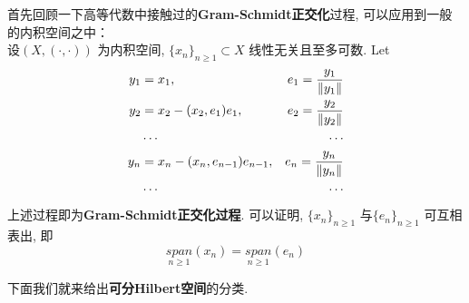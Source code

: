 	首先回顾一下高等代数中接触过的\textbf{Gram-Schmidt正交化}过程, 可以应用到一般的内积空间之中：\\
	设$(X , (\cdot , \cdot))$ 为内积空间, $\{ x_n \}_{n \geq 1} \subset X$ 线性无关且至多可数. Let
	\begin{align}
		y_1 &= x_1 , \hspace*{0.5em} &e_1 = \frac{y_1}{\Vert y_1 \Vert} \\
		y_2&= x_2 - (x_2 , e_1)e_1 , &e_2 = \frac{y_2}{\Vert y_2 \Vert} \\
		&\cdots &\cdots \\
		y_n &= x_n - (x_n , e_{n - 1})e_{n - 1} , &e_n = \frac{y_n}{\Vert y_n \Vert} \\
		&\cdots &\cdots
	\end{align}
	上述过程即为\textbf{Gram-Schmidt正交化过程}. 可以证明, $\{ x_n \}_{n \geq 1}$ 与$\{ e_n \}_{n \geq 1}$ 可互相表出, 即
	\[ \underset{n \geq 1}{span} (x_n) = \underset{n \geq 1}{span} (e_n) \]
	
	\vspace{6em}
	
	下面我们就来给出\textbf{可分Hilbert空间}的分类. 
	
	\vspace{1em}
	
